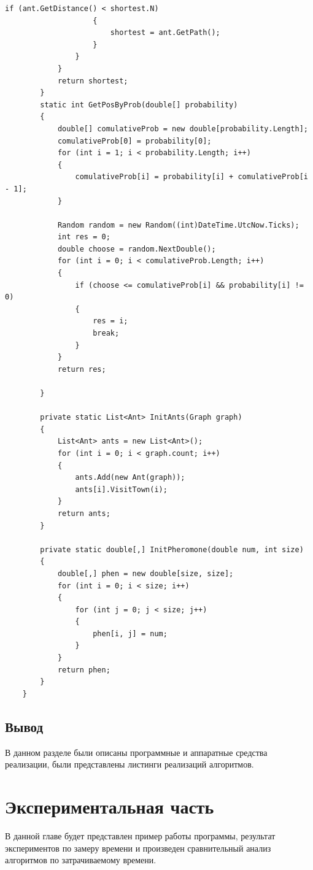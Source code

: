 \documentclass{article}
\begin{document}
\begin{lstlisting}[label=antLst,caption=Муравьиный алгоритм]
                    if (ant.GetDistance() < shortest.N)
                    {
                        shortest = ant.GetPath();
                    }
                }
            }
            return shortest;
        }
        static int GetPosByProb(double[] probability)
        {
            double[] comulativeProb = new double[probability.Length];
            comulativeProb[0] = probability[0];
            for (int i = 1; i < probability.Length; i++)
            {
                comulativeProb[i] = probability[i] + comulativeProb[i - 1];
            }
            
            Random random = new Random((int)DateTime.UtcNow.Ticks);
            int res = 0;
            double choose = random.NextDouble();
            for (int i = 0; i < comulativeProb.Length; i++)
            {
                if (choose <= comulativeProb[i] && probability[i] != 0)
                {
                    res = i;
                    break;
                }
            }
            return res;

        }

        private static List<Ant> InitAnts(Graph graph)
        {
            List<Ant> ants = new List<Ant>();
            for (int i = 0; i < graph.count; i++)
            {
                ants.Add(new Ant(graph));
                ants[i].VisitTown(i);
            }
            return ants;
        }

        private static double[,] InitPheromone(double num, int size)
        {
            double[,] phen = new double[size, size];
            for (int i = 0; i < size; i++)
            {
                for (int j = 0; j < size; j++)
                {
                    phen[i, j] = num;
                }
            }
            return phen;
        }
    }
	\end{lstlisting}
		
	\subsection{Вывод}
	В данном разделе были описаны программные и аппаратные средства реализации, были представлены листинги реализаций алгоритмов.

	\newpage
	\section{Экспериментальная часть}
	В данной главе будет представлен пример работы программы, результат экспериментов по замеру времени и произведен сравнительный анализ алгоритмов по затрачиваемому времени.
\end{document}

